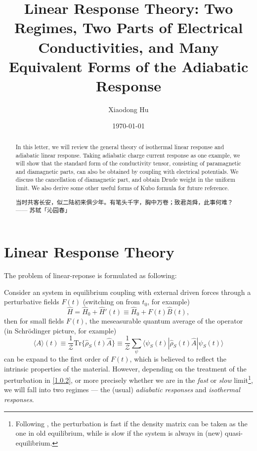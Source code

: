 \documentclass[10pt,nofootinbib,letterpaper]{revtex4}
\newcommand*{\kaishu}{\CJKfamily{kaishu}}
\def\Z{\mathcal{Z}}
\begin{document}
\title{Linear Response Theory: Two Regimes, Two Parts of Electrical Conductivities, and Many Equivalent Forms of the Adiabatic Response}
\author{Xiaodong Hu}


\date{\today}

\begin{abstract}
	In this letter, we will review the general theory of isothermal linear response and adiabatic linear response. Taking adiabatic charge current response as one example, we will show that the standard form of the conductivity tensor, consisting of paramagnetic and diamagnetic parts, can also be obtained by coupling with electrical potentials. We discuss the cancellation of diamagnetic part, and obtain Drude weight in the uniform limit. We also derive some other useful forms of Kubo formula for future reference.\par
		\hfill\par
		{\centering\kaishu 当时共客长安，似二陆初来俱少年。有笔头千字，胸中万卷；致君尧舜，此事何难？\\[0.5em]}
	\hfill------ 苏轼「沁园春」
\end{abstract}

\maketitle
\tableofcontents

\section{Linear Response Theory}
	The problem of linear-reponse is formulated as following:\par
	Consider an system in equilibrium coupling with external driven forces through a perturbative fields $F(t)$ (switching on from $t_0$, for example)
	\begin{equation}\label{1.0.1}
		\hat H=\hat H_0+\hat H'(t)\equiv \hat H_0+F(t)\hat B(t),
	\end{equation}
	then for small fields $F(t)$, the meseasurable quantum average of the operator (in Schr\"{o}dinger picture, for example)
	\begin{equation}\label{1.0.2}
		\langle A\rangle(t)\equiv\dfrac{1}{\Z}\mathrm{Tr}\{\hat{\rho}_S(t)\hat A\}\equiv\dfrac{1}{\Z}\sum_{\psi}\langle\psi_S(t)|\hat\rho_S(t)\hat A|\psi_S(t)\rangle
	\end{equation}
	can be expand to the first order of $F(t)$, which is believed to reflect the intrinsic properties of the material. However, depending on the treatment of the perturbation in \eqref{1.0.2}, or more precisely whether we are in the \emph{fast} or \emph{slow} limit\footnote{Following \cite{luttinger1964theory}, the perturbation is fast if the density matrix can be taken as the one in old equilibrium, while is slow if the system is always in (new) quasi-equilibrium.}, we will fall into two regimes --- the (usual) \emph{adiabatic responses} and \emph{isothermal responses}.
	
\end{document}
